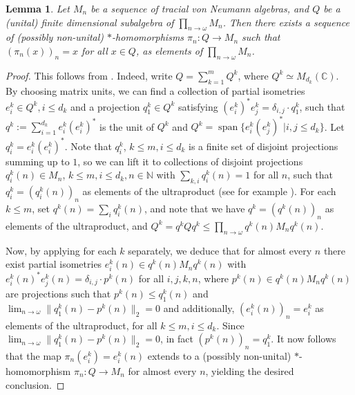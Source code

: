 \documentclass[11pt]{amsart}
\DeclareMathOperator{\spam}{span}
\newcommand{\ultprod}[1]{\prod_{#1 \to \omega}}
\newcommand{\ultlim}[1]{\lim_{#1 \to \omega}}
\newcommand{\N}{{\mathbb{N}}}
\newcommand{\C}{{\mathbb{C}}}
\newtheorem{lemma}[theorem]{Lemma}
\theoremstyle{definition}
\theoremstyle{remark}
\theoremstyle{definition}
\begin{document}
\begin{lemma}\label{lem:lifting_matrix_alg}
    Let $M_n$ be a sequence of tracial von Neumann algebras, and $Q$ be a (unital) finite dimensional subalgebra of $\ultprod{n} M_n$.
    Then there exists a sequence of (\emph{possibly non-unital}) $*$-homomorphisms $\pi_n: Q \to M_n$ such that $(\pi_n(x))_n = x$ for all $x \in Q$, as elements of $\ultprod{n} M_n$.
\end{lemma}
\begin{proof}
    This follows from \cite[Lemma 1.1.12]{Popa}.
    Indeed, write $Q = \sum_{k=1}^m Q^k$, where $Q^k \simeq M_{d_k}(\C)$. By choosing matrix units, we can find a collection of partial isometries $e_i^k \in Q^k, i\leq d_k$ and a projection $q^k_1\in Q^k$ satisfying $(e_i^k)^* e_j^k  =\delta_{i,j} \cdot q^k_1 $, such that  $q^k :=\sum_{i=1}^{d_k} e_i^k (e_i^k)^*$ is the unit of $Q^k$ and  $Q^k = \spam \{e^k_i(e_j^k)^*| i, j \leq d_k \}$.
    Let $q^k_i = e_i^k (e_i^k)^*$. Note that $q^k_i$, $k \leq m, i \leq d_k$ is a finite set of disjoint projections summing up to $1$, so we can lift it to collections of disjoint  projections $q^k_i(n) \in M_n$, $k\leq m,i \leq d_k, n \in \N$ with $\sum_{k,i} q^k_i(n) = 1$ for all $n$, such that $q^k_i = (q^k_i(n))_n$ as elements of the ultraproduct (see for example \cite{HS_alg}).
     For each $k \leq m$, set $q^k(n) = \sum_i q_i^k(n)$, and note that we have  $q^k = (q^k(n))_n$ as elements of the ultraproduct, and $Q^k = q^k Q q^k \leq \ultprod{n} q^k(n) M_n q^k(n)$.
    
    Now, by applying \cite[Lemma 11.1.12]{Popa} for each $k$ separately, we deduce that for almost every $n$ there exist  partial isometries $e^k_i(n) \in q^k(n)M_n q^k(n)$ with $e_i^k(n)^* e_j^k(n) = \delta_{i,j} \cdot p^k(n)$ for all $i,j,k,n$, where $p^k(n) \in q^k(n)M_n q^k(n)$ are projections such that $p^k(n) \leq q^k_1(n)$ and $\ultlim{n} \|q^k_1(n) -  p^k(n) \|_2 =0$ and additionally, $(e^k_i(n))_n = e_i^k$ as elements of the ultraproduct, for all $k \leq m, i \leq d_k$.
    Since $\ultlim{n} \|q^k_1(n) -  p^k(n) \|_2 =0$, in fact $(p^k(n))_n = q^k_1$.
    It now follows that the map $\pi_n(e_i^k) = e_i^k(n)$ extends to a (possibly non-unital) $*$-homomorphism $\pi_n: Q \to M_n$ for almost every $n$, yielding the desired conclusion.
\end{proof}
\end{document}
